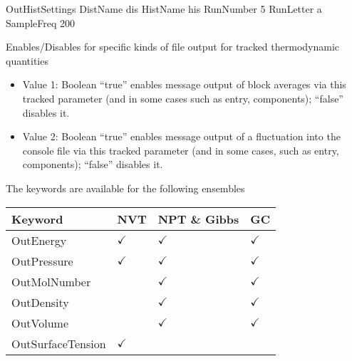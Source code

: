 \documentclass[letterpaper,10pt,english]{sphinxmanual}
\begin{document}
\begin{description}
\begin{itemize}
\end{itemize}

%
\begin{sphinxVerbatim}[commandchars=\\\{\}]
\PYGZsh{}\PYGZsh{}\PYGZsh{}\PYGZsh{}\PYGZsh{}\PYGZsh{}\PYGZsh{}\PYGZsh{}\PYGZsh{}\PYGZsh{}\PYGZsh{}\PYGZsh{}\PYGZsh{}\PYGZsh{}\PYGZsh{}\PYGZsh{}\PYGZsh{}\PYGZsh{}\PYGZsh{}\PYGZsh{}\PYGZsh{}\PYGZsh{}\PYGZsh{}\PYGZsh{}\PYGZsh{}\PYGZsh{}\PYGZsh{}\PYGZsh{}\PYGZsh{}\PYGZsh{}\PYGZsh{}\PYGZsh{}\PYGZsh{}
\PYGZsh{} OutHistSettings
\PYGZsh{}\PYGZsh{}\PYGZsh{}\PYGZsh{}\PYGZsh{}\PYGZsh{}\PYGZsh{}\PYGZsh{}\PYGZsh{}\PYGZsh{}\PYGZsh{}\PYGZsh{}\PYGZsh{}\PYGZsh{}\PYGZsh{}\PYGZsh{}\PYGZsh{}\PYGZsh{}\PYGZsh{}\PYGZsh{}\PYGZsh{}\PYGZsh{}\PYGZsh{}\PYGZsh{}\PYGZsh{}\PYGZsh{}\PYGZsh{}\PYGZsh{}\PYGZsh{}\PYGZsh{}\PYGZsh{}\PYGZsh{}\PYGZsh{}
DistName   dis
HistName   his
RunNumber  5
RunLetter  a
SampleFreq 200
\end{sphinxVerbatim}

\item[{\sphinxcode{\sphinxupquote{OutEnergy, OutPressure, OutMolNumber, OutDensity, OutVolume, OutSurfaceTension}}}] \leavevmode
Enables/Disables for specific kinds of file output for tracked thermodynamic quantities
\begin{itemize}
\item {} 
Value 1: Boolean \textendash{} “true” enables message output of block averages via this tracked parameter (and in some cases such as entry, components); “false” disables it.

\item {} 
Value 2: Boolean \textendash{} “true” enables message output of a fluctuation into the console file via this tracked parameter (and in some cases, such as entry, components); “false” disables it.

\end{itemize}

The keywords are available for the following ensembles


\begin{savenotes}\sphinxattablestart
\centering
\begin{tabulary}{\linewidth}[t]{|T|T|T|T|}
\hline
\sphinxstyletheadfamily 
Keyword
&\sphinxstyletheadfamily 
NVT
&\sphinxstyletheadfamily 
NPT \& Gibbs
&\sphinxstyletheadfamily 
GC
\\
\hline
OutEnergy
&
\(\checkmark\)
&
\(\checkmark\)
&
\(\checkmark\)
\\
\hline
OutPressure
&
\(\checkmark\)
&
\(\checkmark\)
&
\(\checkmark\)
\\
\hline
OutMolNumber
&&
\(\checkmark\)
&
\(\checkmark\)
\\
\hline
OutDensity
&&
\(\checkmark\)
&
\(\checkmark\)
\\
\hline
OutVolume
&&
\(\checkmark\)
&
\(\checkmark\)
\\
\hline
OutSurfaceTension
&
\(\checkmark\)
&&\\
\hline
\end{tabulary}
\par
\sphinxattableend\end{savenotes}


\end{description}
\end{document}
